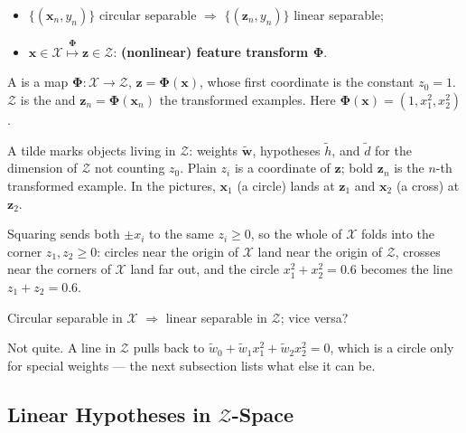 \begin{itemize}
    \item \(\{(\bm{x}_n, y_n)\}\) circular separable \(\Longrightarrow\)
        \(\{(\bm{z}_n, y_n)\}\) linear separable;
    \item \(\bm{x} \in \mathcal{X} \overset{\bm{\Phi}}{\longmapsto} \bm{z} \in
        \mathcal{Z}\): \textbf{(nonlinear) feature transform \(\bm{\Phi}\)}.
\end{itemize}

\begin{definition}\label{def:feature-transform}
    A  is a map \(\bm{\Phi} \colon \mathcal{X} \to
    \mathcal{Z}\), \(\bm{z} = \bm{\Phi}(\bm{x})\), whose first coordinate is the
    constant \(z_0 = 1\). \(\mathcal{Z}\) is the 
    and \(\bm{z}_n = \bm{\Phi}(\bm{x}_n)\) the transformed examples. Here
    \(\bm{\Phi}(\bm{x}) = (1, x_1^2, x_2^2)\).
\end{definition}

\begin{notation}
    A tilde marks objects living in \(\mathcal{Z}\): weights
    \(\tilde{\bm{w}}\), hypotheses \(\tilde{h}\), and \(\tilde{d}\) for the
    dimension of \(\mathcal{Z}\) not counting \(z_0\). Plain \(z_i\) is a
    coordinate of \(\bm{z}\); bold \(\bm{z}_n\) is the \(n\)-th transformed
    example. In the pictures, \(\bm{x}_1\) (a circle) lands at \(\bm{z}_1\)
    and \(\bm{x}_2\) (a cross) at \(\bm{z}_2\).
\end{notation}

Squaring sends both \(\pm x_i\) to the same \(z_i \ge 0\), so the whole of
\(\mathcal{X}\) folds into the corner \(z_1, z_2 \ge 0\): circles near the
origin of \(\mathcal{X}\) land near the origin of \(\mathcal{Z}\), crosses near
the corners of \(\mathcal{X}\) land far out, and the circle \(x_1^2 + x_2^2 =
0.6\) becomes the line \(z_1 + z_2 = 0.6\).

\begin{question}
    Circular separable in \(\mathcal{X}\) \(\Longrightarrow\) linear separable
    in \(\mathcal{Z}\); vice versa?
\end{question}

Not quite. A line in \(\mathcal{Z}\) pulls back to \(\tilde{w}_0 + \tilde{w}_1
x_1^2 + \tilde{w}_2 x_2^2 = 0\), which is a circle only for special weights ---
the next subsection lists what else it can be.

\subsection{Linear Hypotheses in \texorpdfstring{\(\mathcal{Z}\)}{Z}-Space}

